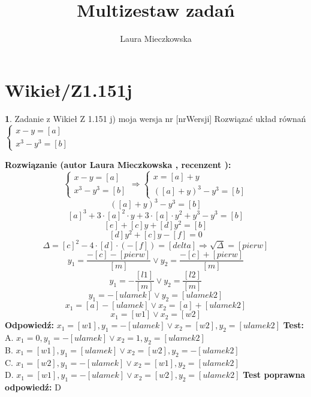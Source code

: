 \documentclass[12pt, a4paper]{article}
\title{Multizestaw zadań}
\author{Laura Mieczkowska}
\date{}
\theoremstyle{definition} %
\newtheorem{zad}{}
\newcommand{\kategoria}[1]{\section{#1}} %
\newcommand{\zadStart}[1]{\begin{zad}#1\newline} %
\newcommand{\zadStop}{\end{zad}}   %
\newcommand{\rozwStart}[2]{\noindent \textbf{Rozwiązanie (autor #1 , recenzent #2): }\newline} %
\newcommand{\odpStart}{\noindent \textbf{Odpowiedź:}\newline}    %
\newcommand{\odpStop}{\newline}                                             %
\newcommand{\testStart}{\noindent \textbf{Test:}\newline} %
\newcommand{\testStop}{\newline} %
\newcommand{\kluczStart}{\noindent \textbf{Test poprawna odpowiedź:}\newline} %
\newcommand{\kluczStop}{\newline} %
\begin{document}
\maketitle


\kategoria{Wikieł/Z1.151j}
\zadStart{Zadanie z Wikieł Z 1.151 j) moja wersja nr [nrWersji]}
Rozwiązać układ równań $\left\{ \begin{array}{l}
x-y=[a]\\
x^3-y^3=[b]
\end{array} \right.$
\zadStop
\rozwStart{Laura Mieczkowska}{}
$$\left\{ \begin{array}{l}
x-y=[a]\\
x^3-y^3=[b] 
\end{array} \right.
\Rightarrow
\left\{ \begin{array}{l}
x=[a]+y\\
([a]+y)^3-y^3=[b]
\end{array} \right.$$
$$([a]+y)^3-y^3=[b]$$
$$[a]^3+3\cdot[a]^2\cdot y+3\cdot[a]\cdot y^2+y^3-y^3=[b]$$
$$[e]+[c]y+[d]y^2=[b]$$
$$[d]y^2+[c]y-[f]=0$$
$$\Delta=[c]^2-4\cdot[d]\cdot(-[f])=[delta]\Rightarrow \sqrt{\Delta}=[pierw]$$
$$y_1=\frac{-[c]-[pierw]}{[m]} \vee y_2=\frac{-[c]+[pierw]}{[m]}$$
$$y_1=-\frac{[l1]}{[m]} \vee y_2=\frac{[l2]}{[m]}$$
$$y_1=-[ulamek] \vee y_2=[ulamek2]$$
$$x_1=[a]-[ulamek] \vee x_2=[a]+[ulamek2]$$
$$x_1=[w1] \vee x_2=[w2]$$
\odpStart
$x_1=[w1], y_1=-[ulamek] \vee x_2=[w2], y_2=[ulamek2]$
\odpStop
\testStart
A. $x_1=0, y_1=-[ulamek] \vee x_2=1, y_2=[ulamek2]$ \\
B. $x_1=[w1], y_1=[ulamek] \vee x_2=[w2], y_2=-[ulamek2]$ \\
C. $x_1=[w2], y_1=-[ulamek] \vee x_2=[w1], y_2=[ulamek2]$ \\
D. $x_1=[w1], y_1=-[ulamek] \vee x_2=[w2], y_2=[ulamek2]$ 
\testStop
\kluczStart
D
\kluczStop
\end{document}
